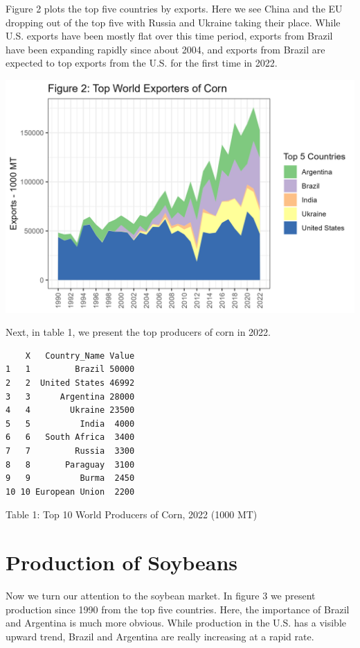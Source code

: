 \documentclass[
  letterpaper,
  DIV=11,
  numbers=noendperiod]{scrreprt}
\begin{document}
Figure 2 plots the top five countries by exports. Here we see China and
the EU dropping out of the top five with Russia and Ukraine taking their
place. While U.S. exports have been mostly flat over this time period,
exports from Brazil have been expanding rapidly since about 2004, and
exports from Brazil are expected to top exports from the U.S. for the
first time in 2022.

\includegraphics{assets/SouthAmericanProduction_TopExporterCorn.png}

Next, in table 1, we present the top producers of corn in 2022.

\begin{verbatim}
    X   Country_Name Value
1   1         Brazil 50000
2   2  United States 46992
3   3      Argentina 28000
4   4        Ukraine 23500
5   5          India  4000
6   6   South Africa  3400
7   7         Russia  3300
8   8       Paraguay  3100
9   9          Burma  2450
10 10 European Union  2200
\end{verbatim}

Table 1: Top 10 World Producers of Corn, 2022 (1000 MT)

\hypertarget{production-of-soybeans}{%
\section{Production of Soybeans}\label{production-of-soybeans}}

Now we turn our attention to the soybean market. In figure 3 we present
production since 1990 from the top five countries. Here, the importance
of Brazil and Argentina is much more obvious. While production in the
U.S. has a visible upward trend, Brazil and Argentina are really
increasing at a rapid rate.
\end{document}
